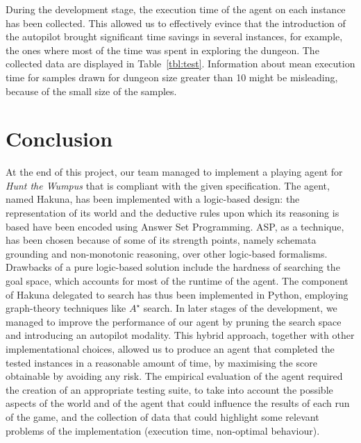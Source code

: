 \documentclass{llncs}
\newcommand{\htw}{\emph{Hunt the Wumpus }}
\begin{document}
During the development stage, the execution time of the agent on each instance has been collected.
This allowed us to effectively evince that the introduction of the autopilot brought significant time savings in several instances, for example, the ones where most of the time was spent in exploring the dungeon.
The collected data are displayed in Table~\ref{tbl:test}. Information about mean execution time for samples drawn for dungeon size greater than 10 might be misleading, because of the small size of the samples.

\section{Conclusion}

At the end of this project, our team managed to implement a playing agent for \htw that is compliant with the given specification.
The agent, named Hakuna, has been implemented with a logic-based design: the representation of its world and the deductive rules upon which its reasoning is based have been encoded using Answer Set Programming.
ASP, as a technique, has been chosen because of some of its strength points, namely schemata grounding and non-monotonic reasoning, over other logic-based formalisms.
Drawbacks of a pure logic-based solution include the hardness of searching the goal space, which accounts for most of the runtime of the agent.
The component of Hakuna delegated to search has thus been implemented in Python, employing graph-theory techniques like $A^{\star}$ search.
In later stages of the development, we managed to improve the performance of our agent by pruning the search space and introducing an autopilot modality.
This hybrid approach, together with other implementational choices, allowed us to produce an agent that completed the tested instances in a reasonable amount of time, by maximising the score obtainable by avoiding any risk.
The empirical evaluation of the agent required the creation of an appropriate testing suite, to take into account the possible aspects of the world and of the agent that could influence the results of each run of the game, and the collection of data that could highlight some relevant problems of the implementation (execution time, non-optimal behaviour).
\end{document}

